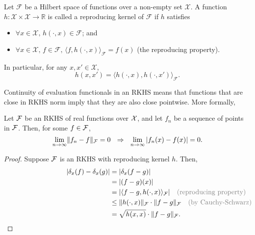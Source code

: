 \begin{definition}\label{def:repkern}
  Let $\mathcal F$ be a Hilbert space of functions over a non-empty set $\mathcal X$. A function $h:\mathcal X\times\mathcal X\rightarrow\mathbb R$ is called a reproducing kernel of $\mathcal F$ if $h$ satisfies
  \begin{itemize}
    \item $\forall x \in \mathcal X,\, h(\cdot, x) \in \mathcal F$; and
    \item $\forall x \in \mathcal X, \, f \in \mathcal F, \, \langle f, h(\cdot, x) \rangle_{\mathcal F} = f(x)$ (the reproducing property).
  \end{itemize}
  In particular, for any $x, x' \in \mathcal X$,
  \[
  	h(x,x') = \langle h(\cdot, x), h(\cdot, x') \rangle_{\mathcal F}.
  \]
\end{definition}

Continuity of evaluation functionals in an RKHS means that functions that are close in RKHS norm imply that they are also close pointwise.
More formally,

\begin{corollary}\label{thm:normpointconv}
  Let ${\mathcal F}$ be an RKHS of real functions over ${\mathcal X}$, and let $f_n$ be a sequence of points in ${\mathcal F}$.
  Then, for some $f\in{\mathcal F}$,
  \[
    \lim_{n\to\infty} \norm{f_n - f}_\cF = 0 \ \ \Rightarrow \ \ \lim_{n\to\infty} |f_n(x) - f(x)| = 0.
  \]
\end{corollary}

\begin{proof}
  Suppose ${\mathcal F}$ is an RKHS with reproducing kernel $h$.
  Then,
  \begin{align*}
    |\delta_x(f) - \delta_x(g)| 
    &= |\delta_x(f-g)| \\
    &= |(f-g)(x)|  \\
    &= |\ip{f-g,h(\cdot,x)}_\cF| \hspace{1em} \rlap{\color{gray} (reproducing property)} \\
    &\leq \norm{h(\cdot,x)}_\cF \cdot \norm{f-g}_\cF \hspace{1em} \rlap{\color{gray} (by Cauchy-Schwarz)} \\
    &= \sqrt{h(x,x)}\cdot \norm{f-g}_\cF.
  \end{align*}
\end{proof}

